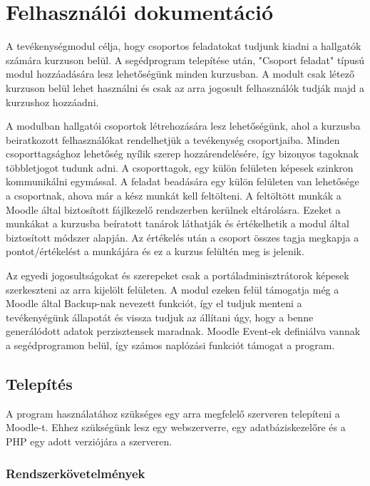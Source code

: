 \chapter{Felhasználói dokumentáció}

\label{ch:user}

A tevékenységmodul célja, hogy csoportos feladatokat tudjunk kiadni a hallgatók számára kurzuson belül. A segédprogram telepítése után, "Csoport feladat" típusú modul hozzáadására lesz lehetőségünk minden kurzusban. A modult csak létező kurzuson belül lehet használni és csak az arra jogosult felhasználók tudják majd a kurzushoz hozzáadni.

A modulban hallgatói csoportok létrehozására lesz lehetőségünk, ahol a kurzusba beiratkozott felhasználókat rendelhetjük a tevékenység csoportjaiba. Minden csoporttagsághoz lehetőség nyílik szerep hozzárendelésére, így bizonyos tagoknak többletjogot tudunk adni. A csoporttagok, egy külön felületen képesek szinkron kommunikálni egymással. A feladat beadására egy külön felületen van lehetősége a csoportnak, ahova már a kész munkát kell feltölteni. A feltöltött munkák a Moodle által biztosított fájlkezelő rendszerben kerülnek eltárolásra. Ezeket a munkákat a kurzusba beíratott tanárok láthatják és értékelhetik a modul által biztosított módszer alapján. Az értékelés után a csoport összes tagja megkapja a pontot/értékelést a munkájára és ez a kurzus felültén meg is jelenik.

Az egyedi jogosultságokat és szerepeket csak a portáladminisztrátorok képesek szerkeszteni az arra kijelölt felületen. A modul ezeken felül támogatja még a Moodle által Backup-nak nevezett funkciót, így el tudjuk menteni a tevékenyégünk állapotát és vissza tudjuk az állítani úgy, hogy a benne generálódott adatok perzisztensek maradnak. Moodle Event-ek definiálva vannak a segédprogramon belül, így számos naplózási funkciót támogat a program.

\section{Telepítés}

A program használatához szükséges egy arra megfelelő szerveren telepíteni a Moodle-t. Ehhez szükségünk lesz egy webszerverre, egy adatbáziskezelőre és a PHP egy adott verziójára a szerveren.

\subsection{Rendszerkövetelmények}


